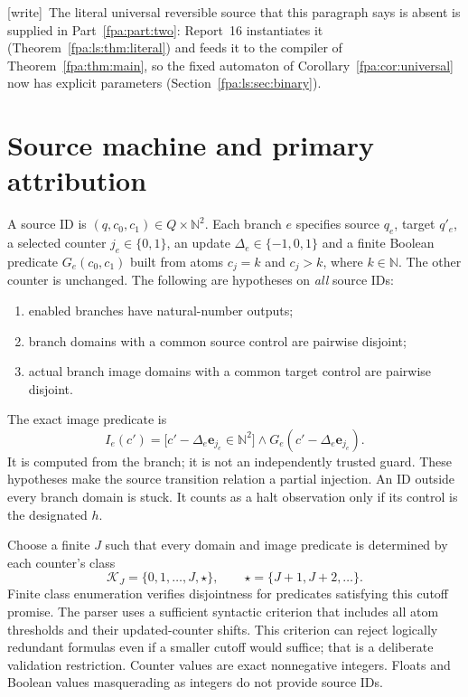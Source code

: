 \documentclass[11pt,a4paper]{article}
\numberwithin{equation}{section}
\newcommand{\N}{\mathbb N}\newcommand{\Z}{\mathbb Z}\newcommand{\R}{\mathbb R}
\newcommand{\wtag}{\textup{[write]}}
\begin{document}
\wtag\ The literal universal reversible source that this paragraph says is absent is supplied in Part~\ref{fpa:part:two}: Report~16 instantiates it (Theorem~\ref{fpa:ls:thm:literal}) and feeds it to the compiler of Theorem~\ref{fpa:thm:main}, so the fixed automaton of Corollary~\ref{fpa:cor:universal} now has explicit parameters (Section~\ref{fpa:ls:sec:binary}).

\section{Source machine and primary attribution}\label{fpa:sec:source}
A source ID is $(q,c_0,c_1)\in Q\times\N^2$. Each branch $e$ specifies source
$q_e$, target $q'_e$, a selected counter $j_e\in\{0,1\}$, an update
$\Delta_e\in\{-1,0,1\}$ and a finite Boolean predicate $G_e(c_0,c_1)$ built
from atoms $c_j=k$ and $c_j>k$, where $k\in\N$. The other counter is unchanged.
The following are hypotheses on \emph{all} source IDs:
\begin{enumerate}
\item enabled branches have natural-number outputs;
\item branch domains with a common source control are pairwise disjoint;
\item actual branch image domains with a common target control are pairwise
disjoint.
\end{enumerate}
The exact image predicate is
\[
 I_e(c')=\bigl[c'-\Delta_e\mathbf e_{j_e}\in\N^2\bigr]
 \wedge G_e(c'-\Delta_e\mathbf e_{j_e}).                 \tag{1}\label{fpa:eq:image}
\]
It is computed from the branch; it is not an independently trusted guard.
These hypotheses make the source transition relation a partial injection.
An ID outside every branch domain is stuck. It counts as a halt observation
only if its control is the designated $h$.

Choose a finite $J$ such that every domain and image predicate is determined
by each counter's class
\[
 \mathcal K_J=\{0,1,\ldots,J,\star\},\qquad \star=\{J+1,J+2,\ldots\}.
\]
Finite class enumeration verifies disjointness for predicates satisfying this
cutoff promise. The parser uses a sufficient syntactic criterion that includes
all atom thresholds and their updated-counter shifts. This criterion can
reject logically redundant formulas even if a smaller cutoff would suffice;
that is a deliberate validation restriction. Counter values are exact
nonnegative integers. Floats and Boolean values masquerading as integers do
not provide source IDs.
\end{document}
